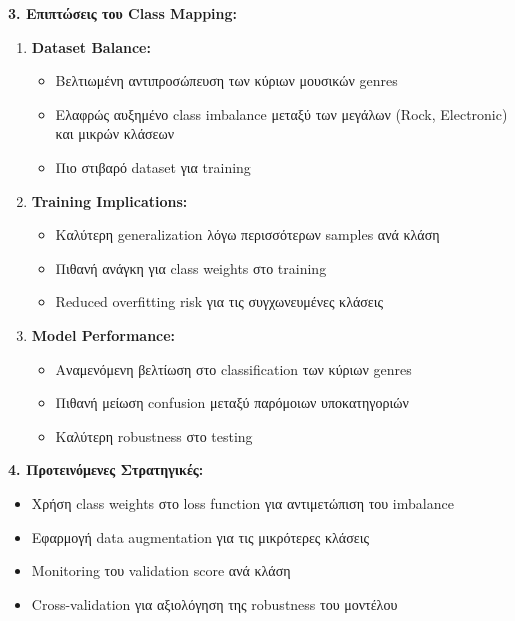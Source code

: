 \documentclass[a4paper,12pt]{article}
\begin{document}
\textbf{3. Επιπτώσεις του Class Mapping:}
\begin{enumerate}
   \item \textbf{Dataset Balance:}
   \begin{itemize}
       \item Βελτιωμένη αντιπροσώπευση των κύριων μουσικών genres
       \item Ελαφρώς αυξημένο class imbalance μεταξύ των μεγάλων (Rock, Electronic) και μικρών κλάσεων
       \item Πιο στιβαρό dataset για training
   \end{itemize}
   
   \item \textbf{Training Implications:}
   \begin{itemize}
       \item Καλύτερη generalization λόγω περισσότερων samples ανά κλάση
       \item Πιθανή ανάγκη για class weights στο training
       \item Reduced overfitting risk για τις συγχωνευμένες κλάσεις
   \end{itemize}
   
   \item \textbf{Model Performance:}
   \begin{itemize}
       \item Αναμενόμενη βελτίωση στο classification των κύριων genres
       \item Πιθανή μείωση confusion μεταξύ παρόμοιων υποκατηγοριών
       \item Καλύτερη robustness στο testing
   \end{itemize}
\end{enumerate}

\textbf{4. Προτεινόμενες Στρατηγικές:}
\begin{itemize}
   \item Χρήση class weights στο loss function για αντιμετώπιση του imbalance
   \item Εφαρμογή data augmentation για τις μικρότερες κλάσεις
   \item Monitoring του validation score ανά κλάση
   \item Cross-validation για αξιολόγηση της robustness του μοντέλου
\end{itemize}



\end{document}
